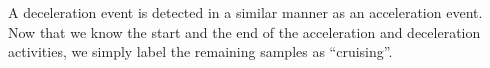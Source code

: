 A deceleration event is detected in a similar manner as an acceleration event. 
Now that we know the start and the end of the acceleration and deceleration activities, we simply label the remaining samples as ``cruising''. 

